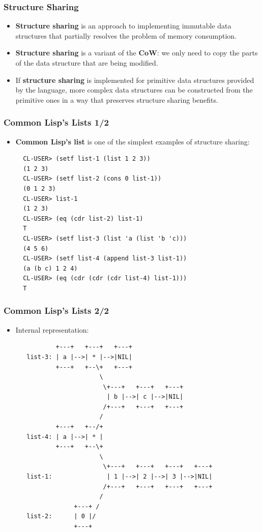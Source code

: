 \documentclass{beamer}
\begin{document}
\begin{frame}[fragile]
  \frametitle{Structure Sharing}
  \begin{itemize}
  \item \textbf{Structure sharing} is an approach to implementing immutable data
    structures that partially resolves the problem of memory consumption.
  \item \textbf{Structure sharing} is a variant of the \textbf{CoW}: we only
    need to copy the parts of the data structure that are being modified.
  \item If \textbf{structure sharing} is implemented for primitive data
    structures provided by the language, more complex data structures can be
    constructed from the primitive ones in a way that preserves structure
    sharing benefits.
  \end{itemize}
\end{frame}

\begin{frame}[fragile]
  \frametitle{Common Lisp's Lists 1/2}
  \begin{itemize}
  \item \textbf{Common Lisp's list} is one of the simplest examples of
    structure sharing:
\begin{verbatim}
  CL-USER> (setf list-1 (list 1 2 3))
  (1 2 3)
  CL-USER> (setf list-2 (cons 0 list-1))
  (0 1 2 3)
  CL-USER> list-1
  (1 2 3)
  CL-USER> (eq (cdr list-2) list-1)
  T
  CL-USER> (setf list-3 (list 'a (list 'b 'c)))
  (4 5 6)
  CL-USER> (setf list-4 (append list-3 list-1))
  (a (b c) 1 2 4)
  CL-USER> (eq (cdr (cdr (cdr list-4) list-1)))
  T
\end{verbatim}
  \end{itemize}
\end{frame}

\begin{frame}[fragile]
  \frametitle{Common Lisp's Lists 2/2}
  \begin{itemize}
  \item Internal representation:
\begin{verbatim}
           +---+   +---+   +---+            
   list-3: | a |-->| * |-->|NIL|            
           +---+   +--\+   +---+            
                       \
                        \+---+   +---+   +---+
                         | b |-->| c |-->|NIL|
                        /+---+   +---+   +---+
                       /  
           +---+   +--/+
   list-4: | a |-->| * |
           +---+   +--\+ 
                       \
                        \+---+   +---+   +---+   +---+
   list-1:               | 1 |-->| 2 |-->| 3 |-->|NIL|
                        /+---+   +---+   +---+   +---+
                       /      
                +---+ /
   list-2:      | 0 |/
                +---+   
\end{verbatim}
  \end{itemize}
\end{frame}
\end{document}

